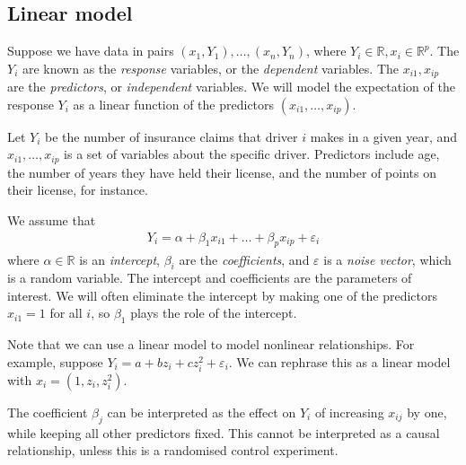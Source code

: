 \subsection{Linear model}
Suppose we have data in pairs $(x_1, Y_1), \dots, (x_n, Y_n)$, where $Y_i \in \mathbb R, x_i \in \mathbb R^p$.
The $Y_i$ are known as the \textit{response} variables, or the \textit{dependent} variables.
The $x_{i1}, x_{ip}$ are the \textit{predictors}, or \textit{independent} variables.
We will model the expectation of the response $Y_i$ as a linear function of the predictors $(x_{i1}, \dots, x_{ip})$.
\begin{example}
	Let $Y_i$ be the number of insurance claims that driver $i$ makes in a given year, and $x_{i1}, \dots, x_{ip}$ is a set of variables about the specific driver.
	Predictors include age, the number of years they have held their license, and the number of points on their license, for instance.
\end{example}
We assume that
\begin{align*}
	Y_i = \alpha + \beta_1 x_{i1} + \dots + \beta_p x_{ip} + \varepsilon_i
\end{align*}
where $\alpha \in \mathbb R$ is an \textit{intercept}, $\beta_i$ are the \textit{coefficients}, and $\varepsilon$ is a \textit{noise vector}, which is a random variable.
The intercept and coefficients are the parameters of interest.
We will often eliminate the intercept by making one of the predictors $x_{i1} = 1$ for all $i$, so $\beta_1$ plays the role of the intercept.

Note that we can use a linear model to model nonlinear relationships.
For example, suppose $Y_i = a + bz_i + cz_i^2 + \varepsilon_i$.
We can rephrase this as a linear model with $x_i = (1, z_i, z_i^2)$.

The coefficient $\beta_j$ can be interpreted as the effect on $Y_i$ of increasing $x_{ij}$ by one, while keeping all other predictors fixed.
This cannot be interpreted as a causal relationship, unless this is a randomised control experiment.

